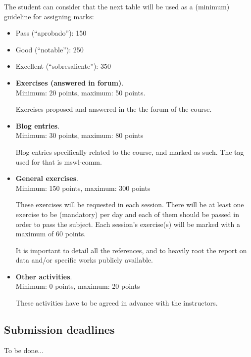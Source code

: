\documentclass[a4paper]{article}
\begin{document}
The student can consider that the next table will be used as a (minimum) guideline for assigning marks:

\begin{itemize}
\item Pass (``aprobado''): 150
\item Good (``notable''): 250
\item Excellent (``sobresaliente''): 350
\end{itemize}

\begin{itemize}
\item \textbf{Exercises (answered in forum)}. \\
  Minimum: 20 points, maximum: 50 points.

  Exercises proposed and answered in the the forum of the course.

\item \textbf{Blog entries}. \\
  Minimum: 30 points, maximum: 80 points

  Blog entries specifically related to the course, and marked as such. The tag used for that is mswl-comm.

\item \textbf{General exercises}. \\
  Minimum: 150 points, maximum: 300 points

  These exercises will be requested in each session. There will be at least one exercise to be (mandatory) per day
  and each of them should be passed in order to pass the subject. Each session's exercise(s) will be marked with a maximum of
  60 points.

  It is important to detail all the references, and to heavily root the report on data and/or specific 
works publicly available. 

\item \textbf{Other activities}. \\
  Minimum: 0 points, maximum: 20 points

  These activities have to be agreed in advance with the instructors.
\end{itemize}

\subsection{Submission deadlines}

To be done...
\end{document}
